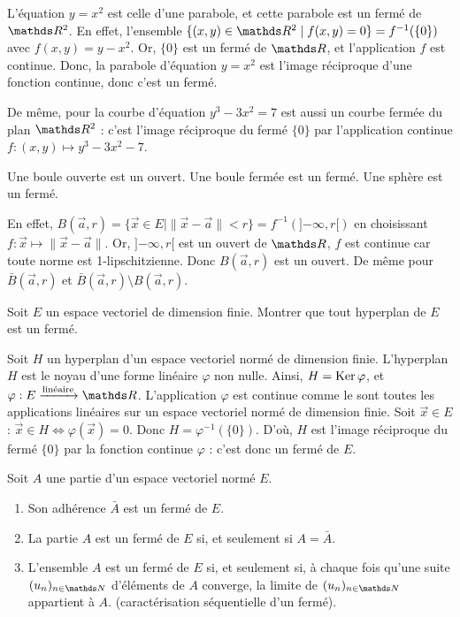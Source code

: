 \begin{exmn}
	L'équation $y = x^2$\/ est celle d'une parabole, et cette parabole est un fermé de $\R^2$.
	En effet, l'ensemble $\{(x,y) \in \R^2  \mid f(x,y) = 0\} = f^{-1}(\{0\})$ avec $f(x,y) = y - x^2$.
	Or, $\{0\}$	 est un fermé de $\R$, et l'application $f$ est continue.
	Donc, la parabole d'équation $y = x^2$ est l'image réciproque d'une fonction continue, donc c'est un fermé.

	De même, pour la courbe d'équation $y^3 - 3 x^2 = 7$ est aussi un courbe fermée du plan $\R^2$\/ : c'est l'image réciproque du fermé $\{0\}$\/ par l'application continue $f : (x,y) \mapsto y^3 - 3x^2 - 7$.
\end{exmn}

\begin{exm}
	\begin{slshape}
		Une boule ouverte est un ouvert.
		Une boule fermée est un fermé.
		Une sphère est un fermé.
	\end{slshape}

	En effet, $B(\vec{a}, r) = \{\vec{x} \in E  \mid \|\vec{x} - \vec{a}\| < r\} = f^{-1}(]{-\infty}, r[)$\/ en choisissant $f :\vec{x} \mapsto \|\vec{x} - \vec{a}\|$. Or, $]{-\infty},r[$\/ est un ouvert de $\R$, $f$ est continue car toute norme est 1-lipschitzienne. Donc $B(\vec{a}, r)$ est un ouvert.
	De même pour $\bar{B}(\vec{a}, r)$\/ et $\bar{B}(\vec{a}, r) \setminus B(\vec{a}, r)$.
\end{exm}

\begin{exo}
	\begin{slshape}
		Soit $E$ un espace vectoriel de dimension finie. Montrer que tout hyperplan de $E$ est un fermé.
	\end{slshape}
	Soit $H$ un hyperplan d'un espace vectoriel normé de dimension finie. L'hyperplan $H$ est le noyau d'une forme linéaire $\varphi$ non nulle. Ainsi, $H = \operatorname{Ker} \varphi$, et $\varphi : E \xrightarrow{\text{linéaire}} \R$.
	L'application $\varphi$ est continue comme le sont toutes les applications linéaires sur un espace vectoriel normé de dimension finie. Soit $\vec{x} \in E$ : $\vec{x}\in H \iff \varphi(\vec{x}) = 0$. Donc $H = \varphi^{-1}(\{0\})$. D'où, $H$\/ est l'image réciproque du fermé $\{0\}$ par la fonction continue $\varphi$ : c'est donc un fermé de $E$.
\end{exo}

\begin{prop}
	Soit $A$ une partie d'un espace vectoriel normé $E$.
	\begin{enumerate}
		\item Son adhérence $\bar{A}$ est un fermé de $E$.
		\item La partie $A$ est un fermé de $E$ si, et seulement si $A = \bar{A}$.
		\item L'ensemble $A$ est un fermé de $E$ si, et seulement si, à chaque fois qu'une suite $(u_n)_{n\in\N}$\/ d'éléments de $A$ converge, la limite de $(u_n)_{n\in\N}$ appartient à $A$. \hfill (caractérisation séquentielle d'un fermé).
	\end{enumerate}
\end{prop}

